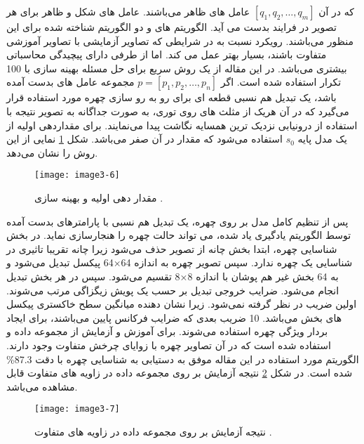 \noindent
که در آن $[q_1, q_2, \ldots , q_m]$ عامل های ظاهر می‌باشند. عامل های شکل و ظاهر برای هر تصویر در فرایند  بدست می آید. الگوریتم های  و   دو الگوریتم شناخته شده برای این منظور می‌باشند. رویکرد  نسبت به  در شرایطی که تصاویر آزمایشی با تصاویر آموزشی متفاوت باشند، بسیار بهتر عمل می کند. اما از طرفی دارای پیچیدگی محاسباتی بیشتری می‌باشد. در این مقاله از یک روش  سریع برای حل مسئله بهینه سازی با 100 تکرار استفاده شده است. اگر $p=[p_1, p_2, \ldots , p_n]$ مجموعه عامل های بدست آمده باشد، یک تبدیل هم نسبی قطعه ای   برای رو به رو سازی چهره مورد استفاده قرار می‌گیرد که در آن هریک از مثلث های روی توری، به صورت جداگانه به تصویر نتیجه با استفاده از درونیابی نزدیک ترین همسایه  نگاشت پیدا می‌نمایند. برای مقداردهی اولیه از یک مدل پایه $s_0$ استفاده می‌شود که مقدار  در آن صفر می‌باشد. شکل \ref{image3-6} نمایی از این روش را نشان می‌دهد. 
 \begin{figure}[h]
\centering
  \texttt{[image: image3-6]}
  \caption{ مقدار دهی اولیه و بهینه سازی  \cite{HAGHIGHAT201623}.}
  \label{image3-6}
\end{figure}

\noindent
پس از تنظیم کامل مدل بر روی چهره، یک تبدیل هم نسبی با پارامترهای بدست آمده توسط الگوریتم یادگیری یاد شده، می تواند حالت چهره را هنجارسازی نماید. در بخش شناسایی چهره، ابتدا بخش چانه از تصویر حذف می‌شود زیرا چانه تقریبا تاثیری در شناسایی یک چهره ندارد. سپس تصویر چهره به اندازه 64×64 پیکسل تبدیل می‌شود و به 64 بخش غیر هم پوشان با اندازه 8×8 تقسیم می‌شود. سپس در هر بخش تبدیل   انجام می‌شود. ضرایب خروجی تبدیل  بر حسب یک پویش زیگزاگی مرتب می‌شوند. اولین ضریب در نظر گرفته نمی‌شود. زیرا نشان دهنده میانگین سطح خاکستری پیکسل های بخش می‌باشد. 10 ضریب بعدی که ضرایب فرکانس پایین می‌باشند، برای ایجاد بردار ویژگی چهره استفاده می‌شوند. برای آموزش و آزمایش از مجموعه داده  و  استفاده شده است که در آن تصاویر چهره با زوایای چرخش متفاوت وجود دارند. الگوریتم مورد استفاده در این مقاله موفق به دستیابی به شناسایی چهره با دقت 87.3\% شده است. در شکل \ref{image3-7} نتیجه آزمایش بر روی مجموعه داده   در زاویه های متفاوت قابل مشاهده می‌باشد.

 \begin{figure}[h]
\centering
  \texttt{[image: image3-7]}
  \caption{نتیجه آزمایش بر روی مجموعه داده   در زاویه های متفاوت \cite{HAGHIGHAT201623}.}
  \label{image3-7}
\end{figure}

